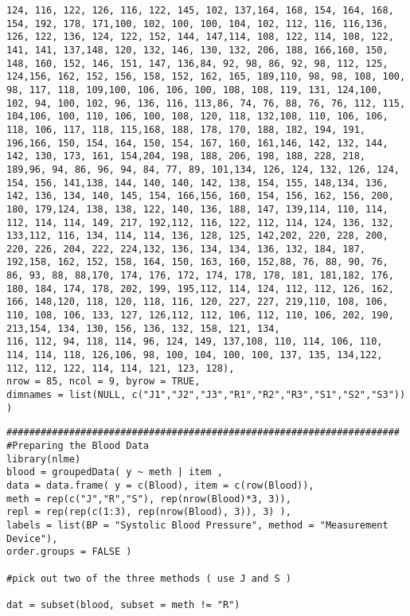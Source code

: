 \begin{verbatim}
124, 116, 122, 126, 116, 122, 145, 102, 137,164, 168, 154, 164, 168, 154, 192, 178, 171,100, 102, 100, 100, 104, 102, 112, 116, 116,136, 126, 122, 136, 124, 122, 152, 144, 147,114, 108, 122, 114, 108, 122, 141, 141, 137,148, 120, 132, 146, 130, 132, 206, 188, 166,160, 150, 148, 160, 152, 146, 151, 147, 136,84, 92, 98, 86, 92, 98, 112, 125, 124,156, 162, 152, 156, 158, 152, 162, 165, 189,110, 98, 98, 108, 100, 98, 117, 118, 109,100, 106, 106, 100, 108, 108, 119, 131, 124,100, 102, 94, 100, 102, 96, 136, 116, 113,86, 74, 76, 88, 76, 76, 112, 115, 104,106, 100, 110, 106, 100, 108, 120, 118, 132,108, 110, 106, 106, 118, 106, 117, 118, 115,168, 188, 178, 170, 188, 182, 194, 191, 196,166, 150, 154, 164, 150, 154, 167, 160, 161,146, 142, 132, 144, 142, 130, 173, 161, 154,204, 198, 188, 206, 198, 188, 228, 218, 189,96, 94, 86, 96, 94, 84, 77, 89, 101,134, 126, 124, 132, 126, 124, 154, 156, 141,138, 144, 140, 140, 142, 138, 154, 155, 148,134, 136, 142, 136, 134, 140, 145, 154, 166,156, 160, 154, 156, 162, 156, 200, 180, 179,124, 138, 138, 122, 140, 136, 188, 147, 139,114, 110, 114, 112, 114, 114, 149, 217, 192,112, 116, 122, 112, 114, 124, 136, 132, 133,112, 116, 134, 114, 114, 136, 128, 125, 142,202, 220, 228, 200, 220, 226, 204, 222, 224,132, 136, 134, 134, 136, 132, 184, 187, 192,158, 162, 152, 158, 164, 150, 163, 160, 152,88, 76, 88, 90, 76, 86, 93, 88, 88,170, 174, 176, 172, 174, 178, 178, 181, 181,182, 176, 180, 184, 174, 178, 202, 199, 195,112, 114, 124, 112, 112, 126, 162, 166, 148,120, 118, 120, 118, 116, 120, 227, 227, 219,110, 108, 106, 110, 108, 106, 133, 127, 126,112, 112, 106, 112, 110, 106, 202, 190, 213,154, 134, 130, 156, 136, 132, 158, 121, 134,
116, 112, 94, 118, 114, 96, 124, 149, 137,108, 110, 114, 106, 110, 114, 114, 118, 126,106, 98, 100, 104, 100, 100, 137, 135, 134,122, 112, 112, 122, 114, 114, 121, 123, 128), 
nrow = 85, ncol = 9, byrow = TRUE,
dimnames = list(NULL, c("J1","J2","J3","R1","R2","R3","S1","S2","S3")) )
\end{verbatim}

\begin{verbatim}
#####################################################################
#Preparing the Blood Data
library(nlme)
blood = groupedData( y ~ meth | item ,
data = data.frame( y = c(Blood), item = c(row(Blood)),
meth = rep(c("J","R","S"), rep(nrow(Blood)*3, 3)),
repl = rep(rep(c(1:3), rep(nrow(Blood), 3)), 3) ),
labels = list(BP = "Systolic Blood Pressure", method = "Measurement Device"),
order.groups = FALSE )

#pick out two of the three methods ( use J and S ) 

dat = subset(blood, subset = meth != "R")

\end{verbatim}




